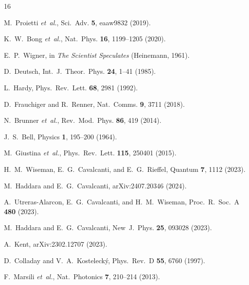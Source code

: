 \documentclass[twocolumn,aps,pra,superscriptaddress,floatfix,10pt]{revtex4-2}
\begin{document}
\begin{thebibliography}{16}

M.~Proietti \emph{et~al.}, Sci.~Adv. \textbf{5}, eaaw9832 (2019).

K.~W.~Bong \emph{et~al.}, Nat.~Phys. \textbf{16}, 1199--1205 (2020).

E.~P.~Wigner, in \emph{The Scientist Speculates} (Heinemann, 1961).

D.~Deutsch, Int.~J.~Theor.~Phys. \textbf{24}, 1--41 (1985).

L.~Hardy, Phys.~Rev.~Lett. \textbf{68}, 2981 (1992).

D.~Frauchiger and R.~Renner, Nat.~Comms. \textbf{9}, 3711 (2018).

N.~Brunner \emph{et~al.}, Rev.~Mod.~Phys. \textbf{86}, 419 (2014).

J.~S.~Bell, Physics \textbf{1}, 195--200 (1964).

M.~Giustina \emph{et~al.}, Phys.~Rev.~Lett. \textbf{115}, 250401 (2015).

H.~M.~Wiseman, E.~G.~Cavalcanti, and E.~G.~Rieffel, Quantum \textbf{7},
1112 (2023).

M.~Haddara and E.~G.~Cavalcanti, arXiv:2407.20346 (2024).

A.~Utreras-Alarcon, E.~G.~Cavalcanti, and H.~M.~Wiseman,
Proc.~R.~Soc.~A \textbf{480} (2023).

M.~Haddara and E.~G.~Cavalcanti, New~J.~Phys. \textbf{25}, 093028 (2023).

A.~Kent, arXiv:2302.12707 (2023).

D.~Colladay and V.~A.~Kosteleck\'{y}, Phys.~Rev.~D \textbf{55}, 6760 (1997).

F.~Marsili \emph{et~al.}, Nat.~Photonics \textbf{7}, 210--214 (2013).

\end{thebibliography}
\end{document}
